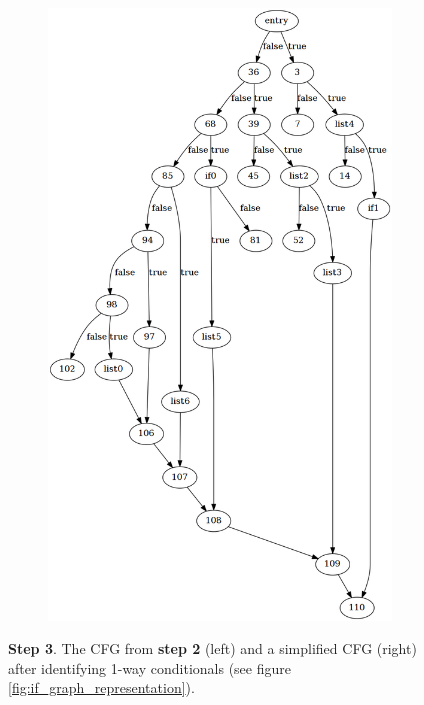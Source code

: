 \begin{figure}[htbp]
\begin{subfigure}[ht]{0.45\textwidth}
		\includegraphics[width=\textwidth]{appendices/control_flow_analysis_example/stmt_3.png}
	\end{subfigure}
	\caption{\textbf{Step 3}. The CFG from \textbf{step 2} (left) and a simplified CFG (right) after identifying 1-way conditionals (see figure \ref{fig:if_graph_representation}).}
	\label{fig:step_3}
\end{figure}

